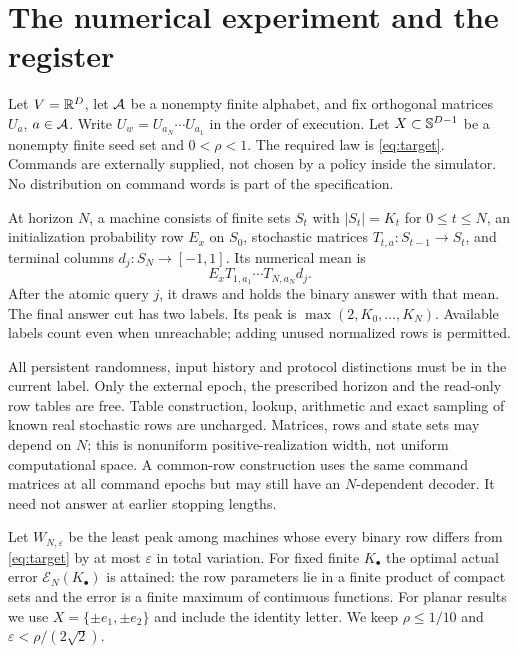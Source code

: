 \section{The numerical experiment and the register}\label{sec:model}
Let $V=\mathbb R^D$, let $\mathcal A$ be a nonempty finite alphabet, and fix orthogonal matrices $U_a$, $a\in\mathcal A$. Write $U_w=U_{a_N}\cdots U_{a_1}$ in the order of execution. Let $X\subset\mathbb S^{D-1}$ be a nonempty finite seed set and $0<\rho<1$. The required law is \eqref{eq:target}. Commands are externally supplied, not chosen by a policy inside the simulator. No distribution on command words is part of the specification.

\begin{definition}\label{def:machine}
At horizon $N$, a machine consists of finite sets $S_t$ with $|S_t|=K_t$ for $0\le t\le N$, an initialization probability row $E_x$ on $S_0$, stochastic matrices $T_{t,a}:S_{t-1}\to S_t$, and terminal columns $d_j:S_N\to[-1,1]$. Its numerical mean is
\[
 E_x T_{1,a_1}\cdots T_{N,a_N}d_j.
\]
After the atomic query $j$, it draws and holds the binary answer with that mean. The final answer cut has two labels. Its peak is $\max(2,K_0,\ldots,K_N)$. Available labels count even when unreachable; adding unused normalized rows is permitted.
\end{definition}

All persistent randomness, input history and protocol distinctions must be in the current label. Only the external epoch, the prescribed horizon and the read-only row tables are free. Table construction, lookup, arithmetic and exact sampling of known real stochastic rows are uncharged. Matrices, rows and state sets may depend on $N$; this is nonuniform positive-realization width, not uniform computational space. A common-row construction uses the same command matrices at all command epochs but may still have an $N$-dependent decoder. It need not answer at earlier stopping lengths.

Let $W_{N,\varepsilon}$ be the least peak among machines whose every binary row differs from \eqref{eq:target} by at most $\varepsilon$ in total variation. For fixed finite $K_\bullet$ the optimal actual error $\mathcal E_N(K_\bullet)$ is attained: the row parameters lie in a finite product of compact sets and the error is a finite maximum of continuous functions. For planar results we use $X=\{\pm e_1,\pm e_2\}$ and include the identity letter. We keep $\rho\le1/10$ and $\varepsilon<\rho/(2\sqrt2)$.

